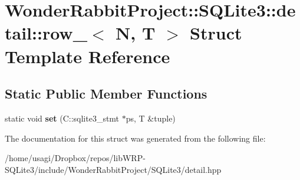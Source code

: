 \hypertarget{structWonderRabbitProject_1_1SQLite3_1_1detail_1_1row__}{\section{Wonder\-Rabbit\-Project\-:\-:S\-Q\-Lite3\-:\-:detail\-:\-:row\-\_\-$<$ N, T $>$ Struct Template Reference}
\label{structWonderRabbitProject_1_1SQLite3_1_1detail_1_1row__}
}
\subsection*{Static Public Member Functions}
\begin{DoxyCompactItemize}
\item 
\hypertarget{structWonderRabbitProject_1_1SQLite3_1_1detail_1_1row___a1836b2992a10a3a1162191af13f300fe}{static void {\bfseries set} (C\-::sqlite3\-\_\-stmt $\ast$ps, T \&tuple)}\label{structWonderRabbitProject_1_1SQLite3_1_1detail_1_1row___a1836b2992a10a3a1162191af13f300fe}

\end{DoxyCompactItemize}


The documentation for this struct was generated from the following file\-:\begin{DoxyCompactItemize}
\item 
/home/usagi/\-Dropbox/repos/lib\-W\-R\-P-\/\-S\-Q\-Lite3/include/\-Wonder\-Rabbit\-Project/\-S\-Q\-Lite3/detail.\-hpp\end{DoxyCompactItemize}
